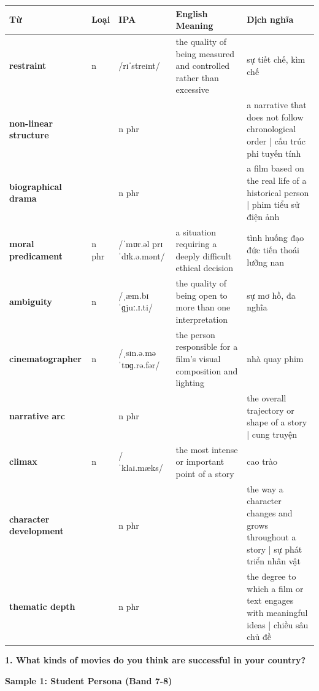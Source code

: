 \vspace{0.8em}
\begin{center}
\renewcommand{\arraystretch}{1.65}
\begin{tabularx}{\textwidth}{|V{0.22\textwidth}|C{0.07\textwidth}|I{0.20\textwidth}|Y|V{0.18\textwidth}|}
\hline
{}
\textbf{Từ} & \textbf{Loại} & \textbf{IPA} & \textbf{English Meaning} & \textbf{Dịch nghĩa} \\
\hline
\textbf{restraint} & n & /rɪˈstreɪnt/ & the quality of being measured and controlled rather than excessive & sự tiết chế, kìm chế \\ \hline
\textbf{non-linear structure} & & n phr & & a narrative that does not follow chronological order | cấu trúc phi tuyến tính \\ \hline
\textbf{biographical drama} & & n phr & & a film based on the real life of a historical person | phim tiểu sử điện ảnh \\ \hline
\textbf{moral predicament} & n phr & /ˈmɒr.əl prɪˈdɪk.ə.mənt/ & a situation requiring a deeply difficult ethical decision & tình huống đạo đức tiến thoái lưỡng nan \\ \hline
\textbf{ambiguity} & n & /ˌæm.bɪˈɡjuː.ɪ.ti/ & the quality of being open to more than one interpretation & sự mơ hồ, đa nghĩa \\ \hline
\textbf{cinematographer} & n & /ˌsɪn.ə.məˈtɒɡ.rə.fər/ & the person responsible for a film's visual composition and lighting & nhà quay phim \\ \hline
\textbf{narrative arc} & & n phr & & the overall trajectory or shape of a story | cung truyện \\ \hline
\textbf{climax} & n & /ˈklaɪ.mæks/ & the most intense or important point of a story & cao trào \\ \hline
\textbf{character development} & & n phr & & the way a character changes and grows throughout a story | sự phát triển nhân vật \\ \hline
\textbf{thematic depth} & & n phr & & the degree to which a film or text engages with meaningful ideas | chiều sâu chủ đề \\ \hline
\end{tabularx}
\end{center}

\partthreeheader

\begin{ieltsquestion}
\textbf{1. What kinds of movies do you think are successful in your country?}
\end{ieltsquestion}
\textbf{Sample 1: Student Persona (Band 7-8)}

